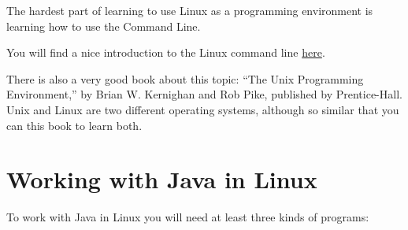 \documentclass[a4paper, 12pt]{article}
\begin{document}
The hardest part of learning to use Linux as a programming environment is
learning how to use the Command Line.

You will find a nice introduction to the Linux command line
\href{http://linuxcommand.org/lc3_learning_the_shell.php}{here}.

There is also a very good book about this topic: ``The Unix Programming
Environment,'' by Brian W. Kernighan and Rob Pike, published by Prentice-Hall.
Unix and Linux are two different operating systems, although so similar that
you can this book to learn both.


\section{Working with Java in Linux}

To work with Java in Linux you will need at least three kinds of programs:
\end{document}
